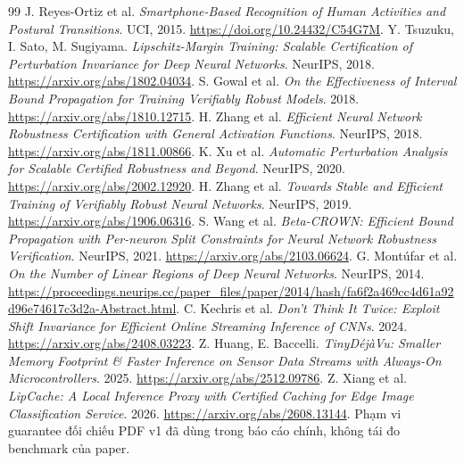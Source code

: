 \documentclass[11pt,a4paper]{article}
\theoremstyle{definition}
\begin{document}
\begin{thebibliography}{99}
 J. Reyes-Ortiz et al. \emph{Smartphone-Based Recognition of
Human Activities and Postural Transitions}. UCI, 2015.
\url{https://doi.org/10.24432/C54G7M}.
 Y. Tsuzuku, I. Sato, M. Sugiyama. \emph{Lipschitz-Margin
Training: Scalable Certification of Perturbation Invariance for Deep Neural
Networks}. NeurIPS, 2018. \url{https://arxiv.org/abs/1802.04034}.
 S. Gowal et al. \emph{On the Effectiveness of Interval Bound
Propagation for Training Verifiably Robust Models}. 2018.
\url{https://arxiv.org/abs/1810.12715}.
 H. Zhang et al. \emph{Efficient Neural Network Robustness
Certification with General Activation Functions}. NeurIPS, 2018.
\url{https://arxiv.org/abs/1811.00866}.
 K. Xu et al. \emph{Automatic Perturbation Analysis for
Scalable Certified Robustness and Beyond}. NeurIPS, 2020.
\url{https://arxiv.org/abs/2002.12920}.
 H. Zhang et al. \emph{Towards Stable and Efficient
Training of Verifiably Robust Neural Networks}. NeurIPS, 2019.
\url{https://arxiv.org/abs/1906.06316}.
 S. Wang et al. \emph{Beta-CROWN: Efficient Bound
Propagation with Per-neuron Split Constraints for Neural Network Robustness
Verification}. NeurIPS, 2021. \url{https://arxiv.org/abs/2103.06624}.
 G. Mont\'ufar et al. \emph{On the Number of Linear
Regions of Deep Neural Networks}. NeurIPS, 2014.
\url{https://proceedings.neurips.cc/paper_files/paper/2014/hash/fa6f2a469cc4d61a92d96e74617c3d2a-Abstract.html}.
 C. Kechris et al. \emph{Don't Think It Twice: Exploit
Shift Invariance for Efficient Online Streaming Inference of CNNs}. 2024.
\url{https://arxiv.org/abs/2408.03223}.
 Z. Huang, E. Baccelli. \emph{TinyD\'ej\`aVu: Smaller Memory
Footprint \& Faster Inference on Sensor Data Streams with Always-On
Microcontrollers}. 2025. \url{https://arxiv.org/abs/2512.09786}.
 Z. Xiang et al. \emph{LipCache: A Local Inference Proxy
with Certified Caching for Edge Image Classification Service}. 2026.
\url{https://arxiv.org/abs/2608.13144}. Phạm vi guarantee đối chiếu PDF v1
đã dùng trong báo cáo chính, không tái đo benchmark của paper.
\end{thebibliography}
\end{document}
